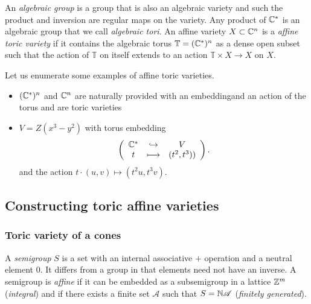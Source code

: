        An \emph{algebraic group} is a group that is also an algebraic variety and such the product and inversion are regular maps on the variety. Any product of $\mathbb{C}^*$ is an algebraic group that we call \emph{algebraic tori}. An affine variety $X\subset\mathbb{C}^n$ is a \emph{affine toric variety} if it contains the algebraic torus $\mathbb{T}=(\mathbb{C}^*)^n$ as a dense open subset such that the action of $\mathbb{T}$ on itself extends to an action $\mathbb{T}\times X\to X$ on $X$.

        \begin{examp*}
            Let us enumerate some examples of affine toric varieties.
            \begin{itemize}
                \item $(\mathbb{C}^*)^n$ and $\mathbb{C}^n$ are naturally provided with an embeddingand an action of the torus and are toric varieties
                \item $V=Z(x^3-y^2)$ with torus embedding
                \begin{equation}
                    \left(
                    \begin{array}{ccc}
                        \mathbb{C}^* & \hookrightarrow & V \\
                        t & \longmapsto & (t^2,t^3))
                    \end{array}
                    \right).
                \end{equation}
                and the action $t\cdot(u,v)\mapsto(t^2u,t^3v)$.
            \end{itemize}
        \end{examp*}

    \subsection{Constructing toric affine varieties}
    
        \subsubsection{Toric variety of a cones}

            A \emph{semigroup} $S$ is a set with an internal associative $+$ operation and a neutral element $0$. It differs from a group in that elements need not have an inverse. A semigroup is \emph{affine} if it can be embedded as a subsemigroup in a lattice $\mathbb{Z}^m$ (\emph{integral}) and if there exists a finite set $\mathscr{A}$ such that $S=\mathbb{N}\mathscr{A}$ (\emph{finitely generated}). 
                
